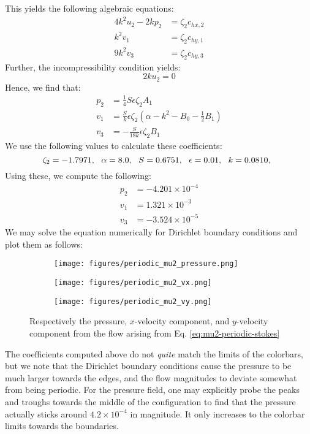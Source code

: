 \documentclass[reqno]{article}
\begin{document}
This yields the following algebraic equations:
\begin{align}
  4 k^2 u_2 - 2k p_2 &= \zeta_2 c_{hx, 2} \\
  k^2 v_1 &= \zeta_2 c_{hy, 1} \\
  9 k^2 v_3 &= \zeta_2 c_{hy, 3}
\end{align}
Further, the incompressibility condition yields:
\begin{equation}
  2k u_2 = 0
\end{equation}
Hence, we find that:
\begin{align}
  p_2 &= \tfrac14 S \epsilon \zeta_2 A_1 \\
  v_1 &= \tfrac{S}{k} \epsilon \zeta_2 (\alpha - k^2 - B_0 - \tfrac12 B_1)   \\
  v_3 &= -\tfrac{S}{18 k} \epsilon \zeta_2 B_1
\end{align}
We use the following values to calculate these coefficients:
\begin{equation}
    \zeta_2 = -1.7971, \:\:\:
    \alpha = 8.0, \:\:\:
    S = 0.6751, \:\:\:
    \epsilon = 0.01, \:\:\:
    k = 0.0810, \:\:\: \\
\end{equation}
Using these, we compute the following:
\begin{align}
  p_2 &= -4.201 \times 10^{-4} \\
  v_1 &= 1.321 \times 10^{-3} \\
  v_3 &= -3.524 \times 10^{-5}
\end{align}
We may solve the equation numerically for Dirichlet boundary conditions and plot
them as follows:
\begin{figure}[H] 
  \centering
  \begin{subfigure}{0.45\textwidth}
    \texttt{[image: figures/periodic\_mu2\_pressure.png]}
    \caption{}
    \label{fig:periodic-mu2-pressure}
  \end{subfigure}
  \hfill
  \begin{subfigure}{0.45\textwidth}
    \texttt{[image: figures/periodic\_mu2\_vx.png]}
    \caption{}
    \label{fig:periodic-mu2-vx}
  \end{subfigure}
  \begin{subfigure}{0.45\textwidth}
    \texttt{[image: figures/periodic\_mu2\_vy.png]}
    \caption{}
    \label{fig:periodic-mu2-vy}
  \end{subfigure}
  \caption{Respectively the pressure, $x$-velocity component, and $y$-velocity
    component from the flow arising from Eq. \eqref{eq:mu2-periodic-stokes}}
  \label{fig:periodic-mu2-plot}
\end{figure}
The coefficients computed above do not \textit{quite} match the limits of the
colorbars, but we note that the Dirichlet boundary conditions cause the pressure
to be much larger towards the edges, and the flow magnitudes to deviate somewhat
from being periodic.
For the pressure field, one may explicitly probe the peaks and troughs towards
the middle of the configuration to find that the pressure actually sticks around 
$4.2 \times 10^{-4}$ in magnitude.
It only increases to the colorbar limits towards the boundaries.
\end{document}
